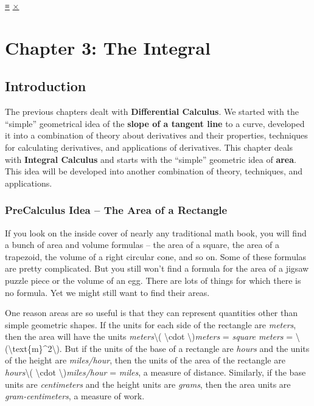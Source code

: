 \protect\hyperlink{main-nav}{≡} \protect\hyperlink{close-nav}{×}

\hypertarget{chapter-3-the-integral}{%
\section{Chapter 3: The Integral}\label{chapter-3-the-integral}}

\hypertarget{introduction}{%
\subsection{Introduction}\label{introduction}}

The previous chapters dealt with \textbf{Differential Calculus}. We
started with the ``simple'' geometrical idea of the \textbf{slope of a
tangent line} to a curve, developed it into a combination of theory
about derivatives and their properties, techniques for calculating
derivatives, and applications of derivatives. This chapter deals with
\textbf{Integral Calculus} and starts with the ``simple'' geometric idea
of \textbf{area}. This idea will be developed into another combination
of theory, techniques, and applications.

\hypertarget{precalculus-idea-the-area-of-a-rectangle}{%
\subsubsection{PreCalculus Idea -- The Area of a
Rectangle}\label{precalculus-idea-the-area-of-a-rectangle}}

If you look on the inside cover of nearly any traditional math book, you
will find a bunch of area and volume formulas -- the area of a square,
the area of a trapezoid, the volume of a right circular cone, and so on.
Some of these formulas are pretty complicated. But you still won't find
a formula for the area of a jigsaw puzzle piece or the volume of an egg.
There are lots of things for which there is no formula. Yet we might
still want to find their areas.

One reason areas are so useful is that they can represent quantities
other than simple geometric shapes. If the units for each side of the
rectangle are \emph{meters}, then the area will have the units
\emph{meters}\textbackslash{}( \textbackslash{}cdot
\textbackslash{})\emph{meters} = \emph{square meters} =
\textbackslash{}(\textbackslash{}text\{m\}\^{}2\textbackslash{}). But if
the units of the base of a rectangle are \emph{hours} and the units of
the height are \emph{miles/hour}, then the units of the area of the
rectangle are \emph{hours}\textbackslash{}( \textbackslash{}cdot
\textbackslash{})\emph{miles/hour} = \emph{miles}, a measure of
distance. Similarly, if the base units are \emph{centimeters} and the
height units are \emph{grams}, then the area units are
\emph{gram-centimeters}, a measure of work.

